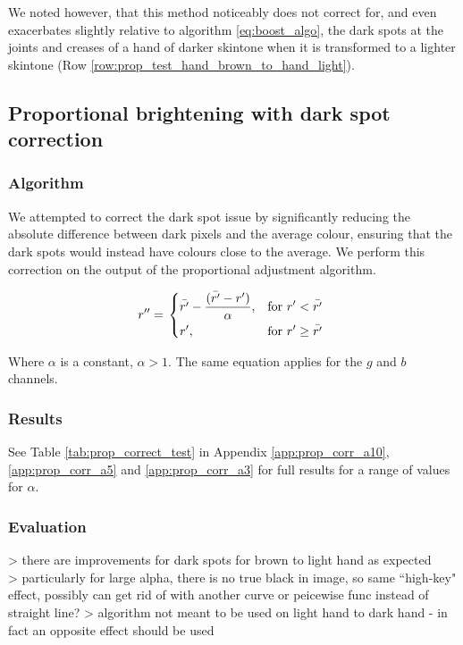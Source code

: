 \documentclass[12pt, a4paper]{article}
\newcommand*\mean[1]{\bar{#1}}
\begin{document}
We noted however, that this method noticeably does not correct for, and even exacerbates slightly relative to algorithm \ref{eq:boost_algo}, the dark spots at the joints and creases of a hand of darker skintone when it is transformed to a lighter skintone (Row \ref{row:prop_test_hand_brown_to_hand_light}).

\subsection{Proportional brightening with dark spot correction}

\subsubsection*{Algorithm}
We attempted to correct the dark spot issue by significantly reducing the absolute difference between dark pixels and the average colour, ensuring that the dark spots would instead have colours close to the average. We perform this correction on the output of the proportional adjustment algorithm.

\begin{equation} \label{eq:prop_corr_algo}
  r'' = \left.
  \begin{dcases}
    \displaystyle \mean{r'} - \frac{(\mean{r'} - r')}{\alpha}, & \text{for } r' < \mean{r'} \\
    \displaystyle r', & \text{for } r' \geq \mean{r'} \\
  \end{dcases}
  \right.\\
\end{equation}

Where $\alpha$ is a constant, $\alpha  > 1$. The same equation applies for the $g$ and $b$ channels.

\subsubsection*{Results}
See Table \ref{tab:prop_correct_test} in Appendix \ref{app:prop_corr_a10}, \ref{app:prop_corr_a5} and \ref{app:prop_corr_a3} for full results for a range of values for $\alpha$. %

\subsubsection*{Evaluation}
> there are improvements for dark spots for brown to light hand as expected\\
> particularly for large alpha, there is no true black in image, so same ``high-key" effect, possibly can get rid of with another curve or peicewise func instead of straight line?
> algorithm not meant to be used on light hand to dark hand - in fact an opposite effect should be used
\end{document}
